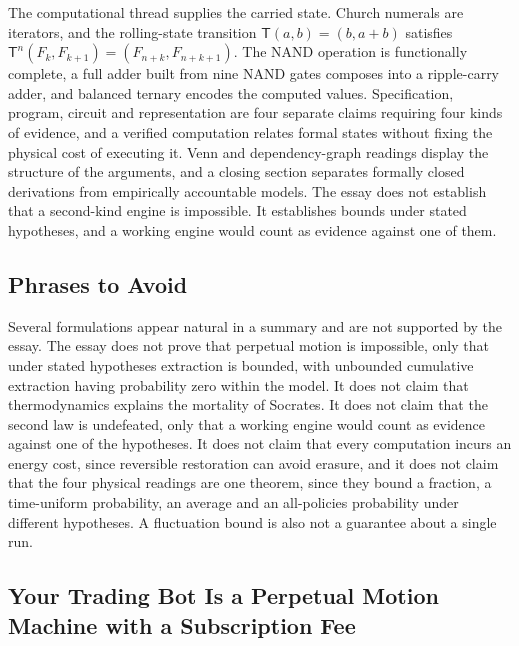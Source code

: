 \documentclass[11pt]{article}
\theoremstyle{definition}
\theoremstyle{remark}
\newcommand{\Tm}{\mathsf{T}}
\begin{document}
The computational thread supplies the carried state. Church numerals are iterators, and the rolling-state transition $\Tm(a,b) = (b, a+b)$ satisfies $\Tm^{n}(F_k, F_{k+1}) = (F_{n+k}, F_{n+k+1})$. The NAND operation is functionally complete, a full adder built from nine NAND gates composes into a ripple-carry adder, and balanced ternary encodes the computed values. Specification, program, circuit and representation are four separate claims requiring four kinds of evidence, and a verified computation relates formal states without fixing the physical cost of executing it. Venn and dependency-graph readings display the structure of the arguments, and a closing section separates formally closed derivations from empirically accountable models. The essay does not establish that a second-kind engine is impossible. It establishes bounds under stated hypotheses, and a working engine would count as evidence against one of them.

\subsection{Phrases to Avoid}

Several formulations appear natural in a summary and are not supported by the essay. The essay does not prove that perpetual motion is impossible, only that under stated hypotheses extraction is bounded, with unbounded cumulative extraction having probability zero within the model. It does not claim that thermodynamics explains the mortality of Socrates. It does not claim that the second law is undefeated, only that a working engine would count as evidence against one of the hypotheses. It does not claim that every computation incurs an energy cost, since reversible restoration can avoid erasure, and it does not claim that the four physical readings are one theorem, since they bound a fraction, a time-uniform probability, an average and an all-policies probability under different hypotheses. A fluctuation bound is also not a guarantee about a single run.

\subsection{Your Trading Bot Is a Perpetual Motion Machine with a Subscription Fee}
\end{document}
